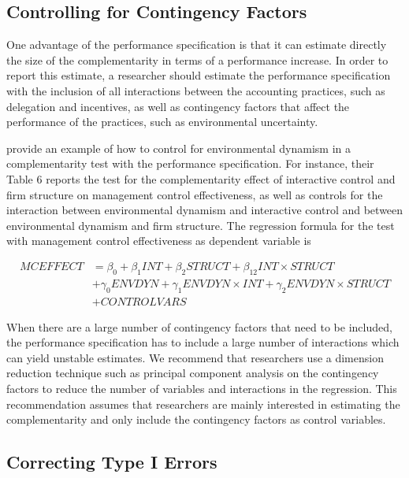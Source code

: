 \documentclass[12pt]{article}
\begin{document}
\subsection{Controlling for Contingency Factors}

One advantage of the performance specification is that it can estimate directly the size of the complementarity in terms of a performance increase. In order to report this estimate, a researcher should estimate the performance specification with the inclusion of all interactions between the accounting practices, such as delegation and incentives, as well as contingency factors that affect the performance of the practices, such as environmental uncertainty. 

\citet{bedford_management_2016} provide an example of how to control for environmental dynamism in a complementarity test with the performance specification. For instance, their Table 6 reports the test for the complementarity effect of interactive control and firm structure on management control effectiveness, as well as controls for the interaction between environmental dynamism and interactive control and between environmental dynamism and firm structure. The regression formula for the test with management control effectiveness as dependent variable is 

\begin{align*}
MCEFFECT &= \beta_0 + \beta_1 INT + \beta_2 STRUCT + \beta_{12} INT \times STRUCT \\
&+\gamma_0 ENVDYN + \gamma_1 ENVDYN \times INT + \gamma_2 ENVDYN\times STRUCT \\
&+ CONTROLVARS 
\end{align*}

When there are a large number of contingency factors that need to be included, the performance specification has to include a large number of interactions which can yield unstable estimates. We recommend that researchers use a dimension reduction technique such as principal component analysis on the contingency factors to reduce the number of variables and interactions in the regression. This recommendation assumes that researchers are mainly interested in estimating the complementarity and only include the contingency factors as control variables.

\subsection{Correcting Type I Errors}
\end{document}
